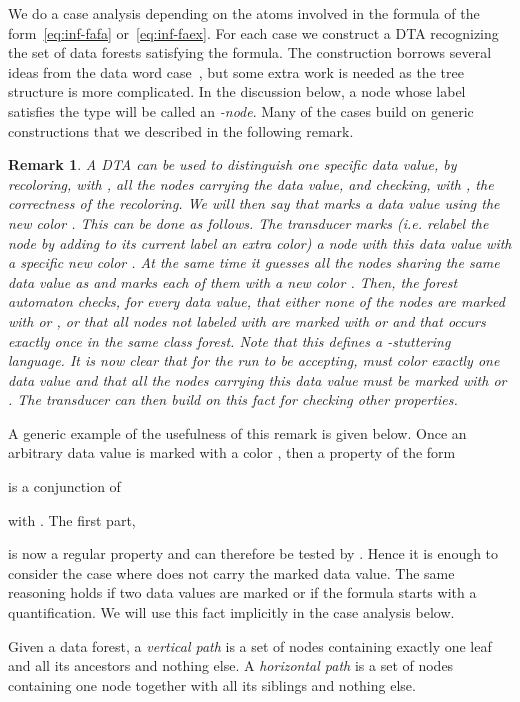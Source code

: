 \documentclass{CSML}
\newtheorem{remark}{Remark}
\newcommand\dad{\textup{DTA}\xspace}
\begin{document}
We do a case analysis depending on the atoms involved in the formula of the
form~\eqref{eq:inf-fafa} or~\eqref{eq:inf-faex}. 
For each case we construct a \dad  
recognizing the set of data forests satisfying the formula.  
The construction borrows several ideas from the data word case~\cite{BDMSS11}, but
some extra work is needed as the tree structure is more complicated.
In the discussion below, a node whose label satisfies the type  will
be called an \emph{-node}.
Many of the cases build on generic constructions that we described 
in the following remark.
\begin{remark}\label{remark-color-class}
  A \dad  can be used to distinguish one specific data value, by recoloring, with , all the nodes carrying the
  data value, and checking, with , the correctness of the recoloring.  We
  will then say that  \emph{marks a data value using the new color
    }.  This can be done as follows.  The transducer  marks
  (i.e. relabel the node by adding to its current label an extra color) a node  with
  this data value with a specific new color .  At the same time it guesses
  all the nodes sharing the same data value as  and marks each of them with
  a new color .  Then, the forest automaton  checks, for every data
  value, that either none of the nodes are marked with  or , or that all
  nodes not labeled with  are marked with  or  and that  occurs
  exactly once in the same class forest.  Note that this defines a
  -stuttering language.  It is now clear that for the run to be accepting,
   must color exactly one data value and that all the nodes carrying this
  data value must be marked with  or .  The transducer  can then
  build on this fact for checking other properties.
\end{remark}

\noindent
A generic example of the usefulness of this remark is given below.
Once an arbitrary data value is marked with a color , 
then a property of the form 
 
is a conjunction of 
 
with 
. 
 The first part, 
 
is now a regular property and can therefore be tested by . 
Hence it is enough to consider the case where  does not carry the marked data value. 
The same reasoning holds if two data values are marked or if the formula starts with a 
 quantification. 
We will use this fact implicitly in the case analysis below.

Given a data forest, a \emph{vertical path} is a set of nodes containing exactly
one leaf and all its ancestors and nothing else.  A \emph{horizontal path} is a
set of nodes containing one node together with all its siblings and nothing else.
\end{document}
